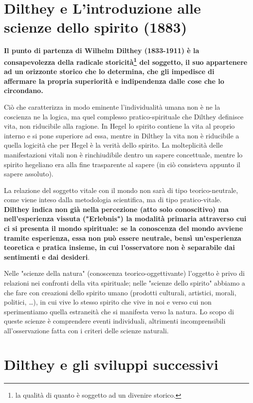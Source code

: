 \section{Dilthey e L'introduzione alle scienze dello spirito (1883)}

\textbf{Il punto di partenza di Wilhelm Dilthey (1833-1911) è la consapevolezza della radicale storicità\footnote{la qualità  di quanto è soggetto ad un divenire storico.} del soggetto, il suo appartenere ad un orizzonte storico che lo determina, che gli impedisce di affermare la propria superiorità e indipendenza dalle cose che lo circondano.}

Ciò che caratterizza  in modo eminente l'individualità umana non è ne la coscienza ne la logica, ma quel complesso pratico-spirituale che Dilthey definisce vita, non riducibile alla ragione. In Hegel lo spirito contiene la vita al proprio interno e si pone superiore ad essa, mentre in Dilthey la vita non è riducibile a quella logicità che per Hegel è la verità dello spirito. La molteplicità delle manifestazioni vitali non è rinchiudibile dentro un sapere concettuale, mentre lo spirito hegeliano era alla fine trasparente al sapere (in ciò consisteva appunto il sapere assoluto).

La relazione del soggetto vitale con il mondo non sarà di tipo teorico-neutrale, come viene inteso dalla metodologia scientifica, ma di tipo pratico-vitale. \textbf{Dilthey indica non già nella percezione (atto solo conoscitivo) ma nell'esperienza vissuta ("Erlebnis") la modalità primaria attraverso cui ci si presenta il mondo spirituale: se la conoscenza del mondo avviene tramite esperienza, essa non può essere neutrale, bensì un'esperienza teoretica e pratica insieme, in cui l'osservatore non è separabile dai sentimenti e dai desideri}.

Nelle "scienze della natura" (conoscenza teorico-oggettivante) l'oggetto è privo di relazioni nei confronti della vita spirituale; nelle "scienze dello spirito" abbiamo a che fare con creazioni dello spirito umano (prodotti culturali, artistici, morali, politici, \dots), in cui vive lo stesso spirito che vive in noi e verso cui non sperimentiamo quella estraneità che si manifesta verso la natura. Lo scopo di queste scienze è comprendere eventi individuali, altrimenti incomprensibili all'osservazione fatta con i criteri delle scienze naturali.

\section{Dilthey e gli sviluppi successivi}

